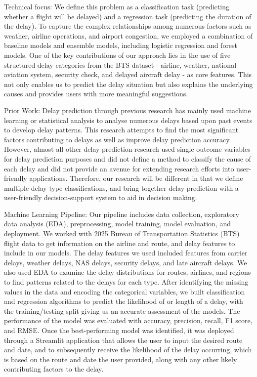 Technical focus: We define this problem as a classification task (predicting whether a flight will be delayed) and a regression task (predicting the duration of the delay). To capture the complex relationships among numerous factors such as weather, airline operations, and airport congestion, we employed a combination of baseline models and ensemble models, including logistic regression and forest models. One of the key contributions of our approach lies in the use of five structured delay categories from the BTS dataset - airline, weather, national aviation system, security check, and delayed aircraft delay - as core features. This not only enables us to predict the delay situation but also explains the underlying causes and provides users with more meaningful suggestions.

Prior Work: Delay prediction through previous research has mainly used machine learning or statistical analysis to analyse numerous delays based upon past events to develop delay patterns. This research attempts to find the most significant factors contributing to delays as well as improve delay prediction accuracy. However, almost all other delay prediction research used single outcome variables for delay prediction purposes and did not define a method to classify the cause of each delay and did not provide an avenue for extending research efforts into user-friendly applications. Therefore, our research will be different in that we define multiple delay type classifications, and bring together delay prediction with a user-friendly decision-support system to aid in decision making.

Machine Learning Pipeline: Our pipeline includes data collection, exploratory data analysis (EDA), preprocessing, model training, model evaluation, and deployment. We worked with 2025 Bureau of Transportation Statistics (BTS) flight data to get information on the airline and route, and delay features to include in our models. The delay features we used included features from carrier delays, weather delays, NAS delays, security delays, and late aircraft delays. We also used EDA to examine the delay distributions for routes, airlines, and regions to find patterns related to the delays for each type. After identifying the missing values in the data and encoding the categorical variables, we built classification and regression algorithms to predict the likelihood of or length of a delay, with the training/testing split giving us an accurate assessment of the models. The performance of the model was evaluated with accuracy, precision, recall, F1 score, and RMSE. Once the best-performing model was identified, it was deployed through a Streamlit application that allows the user to input the desired route and date, and to subsequently receive the likelihood of the delay occurring, which is based on the route and date the user provided, along with any other likely contributing factors to the delay.

